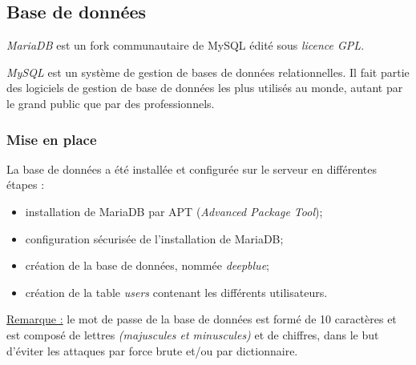 \subsection{Base de données}
\label{subsec:bd}

\emph{MariaDB} est un fork communautaire de MySQL édité sous \textit{licence
GPL}.

\emph{MySQL} est un système de gestion de bases de données relationnelles. Il fait
partie des logiciels de gestion de base de données les plus utilisés au monde,
autant par le grand public que par des professionnels.

\subsubsection{Mise en place}
\label{subsubsec:mise-en-place}

La base de données a été installée et configurée sur le serveur en différentes
étapes :

\begin{itemize}
    \item installation de MariaDB par APT
    (\emph{Advanced Package Tool});
    \item configuration sécurisée de l'installation de MariaDB;
    \item création de la base de données, nommée \textit{deepblue};
    \item création de la table \og \textit{users} \fg contenant les
    différents utilisateurs. \\
\end{itemize}

\underline{Remarque :} le mot de passe de la base de données est formé de 10
caractères et est composé de lettres \emph{(majuscules et minuscules)} et de
chiffres, dans le but d'éviter les attaques par force brute et/ou par dictionnaire.

